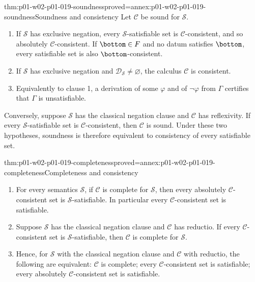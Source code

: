 \begin{hbtheorem}{thm:p01-w02-p01-019-soundness}{proved=annex:p01-w02-p01-019-soundness}{Soundness and consistency}
Let \(\mathcal C\) be sound for \(\mathcal S\).
\begin{enumerate}
  \item If \(\mathcal S\) has exclusive negation, every
        \(\mathcal S\)-satisfiable set is \(\mathcal C\)-consistent, and so
        absolutely \(\mathcal C\)-consistent. If \(\bottom\in F\) and no
        datum satisfies \(\bottom\), every satisfiable set is also
        \(\bottom\)-consistent.
  \item If \(\mathcal S\) has exclusive negation and
        \(\mathcal D_{\mathcal S}\neq\varnothing\), the calculus
        \(\mathcal C\) is consistent.
  \item Equivalently to clause 1, a derivation of some \(\varphi\) and of
        \(\neg\varphi\) from \(\Gamma\) certifies that \(\Gamma\) is
        unsatisfiable.
\end{enumerate}
Conversely, suppose \(\mathcal S\) has the classical negation clause and
\(\mathcal C\) has reflexivity. If every \(\mathcal S\)-satisfiable set is
\(\mathcal C\)-consistent, then \(\mathcal C\) is sound. Under these two
hypotheses, soundness is therefore equivalent to consistency of every
satisfiable set.
\end{hbtheorem}

\begin{hbtheorem}{thm:p01-w02-p01-019-completeness}{proved=annex:p01-w02-p01-019-completeness}{Completeness and consistency}
\begin{enumerate}
  \item For every semantics \(\mathcal S\), if \(\mathcal C\) is complete for
        \(\mathcal S\), then every absolutely \(\mathcal C\)-consistent set
        is \(\mathcal S\)-satisfiable. In particular every
        \(\mathcal C\)-consistent set is satisfiable.
  \item Suppose \(\mathcal S\) has the classical negation clause and
        \(\mathcal C\) has reductio. If every \(\mathcal C\)-consistent set is
        \(\mathcal S\)-satisfiable, then \(\mathcal C\) is complete for
        \(\mathcal S\).
  \item Hence, for \(\mathcal S\) with the classical negation clause and
        \(\mathcal C\) with reductio, the following are equivalent:
        \(\mathcal C\) is complete; every \(\mathcal C\)-consistent set is
        satisfiable; every absolutely \(\mathcal C\)-consistent set is
        satisfiable.
\end{enumerate}
\end{hbtheorem}

